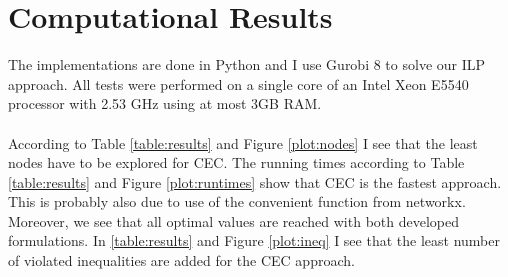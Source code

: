 \documentclass[11pt]{article}
\begin{document}
\section{Computational Results}
The implementations are done in Python and I use Gurobi 8 to solve our ILP approach.
All tests were performed on a single core of an 
Intel Xeon E5540 processor with 2.53 GHz
using at most 3GB RAM.
\\ \\
According to Table \ref{table:results} and Figure \ref{plot:nodes} I see that the least nodes have to be explored for CEC. The running times according to Table \ref{table:results} and Figure \ref{plot:runtimes} show that CEC is the fastest approach. This is probably also due to use of the convenient function from networkx. Moreover, we see that all optimal values are reached with both developed formulations. In \ref{table:results} and Figure \ref{plot:ineq} I see that the least number of violated inequalities are added for the CEC approach. 
\end{document}
